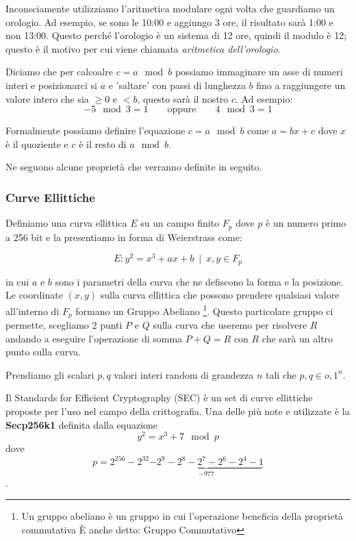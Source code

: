 \documentclass[12pt,a4paper]{article}
\begin{document}
Inconsciamente utilizziamo l'aritmetica modulare ogni volta che guardiamo un
orologio. Ad esempio, se sono le 10:00 e aggiungo 3 ore, il risultato sarà 1:00
e non 13:00. Questo perché l'orologio è un sistema di 12 ore, quindi il modulo è
12; questo è il motivo per cui viene chiamata \textit{aritmetica dell'orologio}.

Diciamo che per calcoalre $ c = a \mod{b} $ possiamo immaginare un asse di
numeri interi e posizionarci si $ a $ e 'saltare' con passi di lunghezza $ b $
fino a raggiungere un valore intero che sia $ \ge 0 $ e $ < b $, questo sarà il
nostro $ c $. Ad esempio:
$$ -5 \mod{3} = 1 \qquad \text{oppure} \qquad 4 \mod 3 = 1 $$

Formalmente possiamo definire l'equazione $ c = a \mod{b} $ come $ a = bx + c $
dove $ x $ è il quoziente e $ c $ è il resto di $ a \mod b $.

Ne seguono alcune proprietà che verranno definite in seguito.

\subsubsection{Curve Ellittiche}
Definiamo una curva ellittica $ E $ su un campo finito $ F_p $ dove $ p $ è un
numero primo a 256 bit e la presentiamo in forma di Weierstrass come:

$$ E: y^2 = x^3 + ax + b \enspace | \enspace x, y \in F_p $$

in cui $ a $ e $ b $ sono i parametri della curva che ne defiscono la forma e la
posizione. Le coordinate $ (x,y) $ sulla curva ellittica che possono prendere
qualsiasi valore all'interno di $F_p$ formano un Gruppo Abeliano \footnote{Un
gruppo abeliano è un gruppo in cui l'operazione beneficia della proprietà
commutativa È anche detto: Gruppo Commutativo}.
Questo particolare gruppo ci permette, scegliamo 2 punti $ P $ e $ Q $ sulla curva che 
useremo per risolvere $ R $ andando a eseguire l'operazione di somma $ P + Q = R $ 
con $ R $ che sarà un altro punto sulla curva.

Prendiamo gli scalari $p, q$ valori interi random di grandezza $n$ tali che $ p,
q \in {o,1}^n $.

Il Standards for Efficient Cryptography (SEC) è un set di curve ellittiche
proposte per l'uso nel campo della crittografia. Una delle più note e utilizzate
è la \textbf{Secp256k1} definita dalla equazione
$$ y^2 = x^3 + 7 \mod{p} $$ 
dove 
$$ p = 2^{256} - 2^{32} \underbrace{- 2^9 - 2^8 - 2^7 - 2^6 - 2^4 - 1}_{-977} $$.
\end{document}
